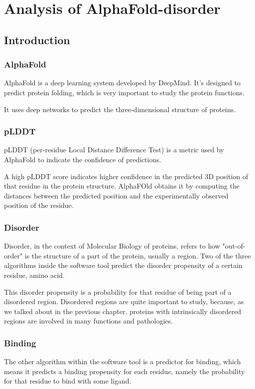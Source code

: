 \chapter{Analysis of AlphaFold-disorder}
\label{chp:alphafold-disorder}


\section{Introduction}

\subsection{AlphaFold}
AlphaFold is a deep learning system developed by DeepMind. It's designed to predict protein folding, which is very important to study the protein functions.

It uses deep networks to predict the three-dimensional structure of proteins.

\subsection{pLDDT}

pLDDT (per-residue Local Distance Difference Test) is a metric used by AlphaFold to indicate the confidence of predictions.

A high pLDDT score indicates higher confidence in the predicted 3D position of that residue in the protein structure. AlphaFOld obtains it by computing the distances between the predicted position and the experimentally observed position of the residue.


\subsection{Disorder}
Disorder, in the context of Molecular Biology of proteins, refers to how "out-of-order" is the structure of a part of the protein, usually a region. Two of the three algorithms inside the software tool predict the disorder propensity of a certain residue, amino acid. 

This disorder propensity is a probability for that residue of being part of a disordered region. Disordered regions are quite important to study, because, as we talked about in the previous chapter, proteins with intrinsically disordered regions are involved in many functions and pathologies.

\subsection{Binding}
The other algorithm within the software tool is a predictor for binding, which means it predicts a binding propensity for each residue, namely the probability for that residue to bind with some ligand.

